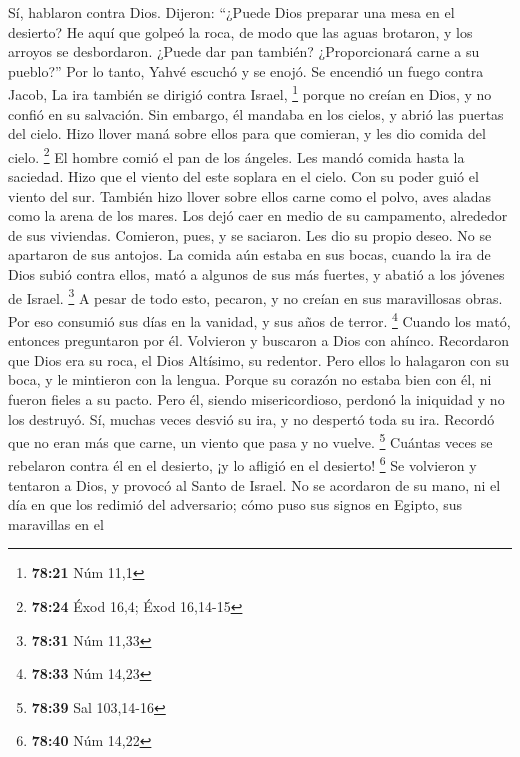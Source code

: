 \begin{paracol}{2}
 Sí, hablaron contra Dios. Dijeron: ``¿Puede Dios
preparar una mesa en el desierto?  He aquí que golpeó la
roca, de modo que las aguas brotaron, y los arroyos se desbordaron.
¿Puede dar pan también? ¿Proporcionará carne a su pueblo?''
 Por lo tanto, Yahvé escuchó y se enojó. Se encendió un
fuego contra Jacob, La ira también se dirigió contra Israel, \footnote{\textbf{78:21}
  Núm 11,1}  porque no creían en Dios, y no confió en su
salvación.  Sin embargo, él mandaba en los cielos, y
abrió las puertas del cielo.  Hizo llover maná sobre
ellos para que comieran, y les dio comida del cielo. \footnote{\textbf{78:24}
  Éxod 16,4; Éxod 16,14-15}  El hombre comió el pan de
los ángeles. Les mandó comida hasta la saciedad.  Hizo
que el viento del este soplara en el cielo. Con su poder guió el viento
del sur.  También hizo llover sobre ellos carne como el
polvo, aves aladas como la arena de los mares.  Los dejó
caer en medio de su campamento, alrededor de sus viviendas.
 Comieron, pues, y se saciaron. Les dio su propio deseo.
 No se apartaron de sus antojos. La comida aún estaba en
sus bocas,  cuando la ira de Dios subió contra ellos,
mató a algunos de sus más fuertes, y abatió a los jóvenes de Israel.
\footnote{\textbf{78:31} Núm 11,33}  A pesar de todo
esto, pecaron, y no creían en sus maravillosas obras. 
Por eso consumió sus días en la vanidad, y sus años de terror.
\footnote{\textbf{78:33} Núm 14,23}  Cuando los mató,
entonces preguntaron por él. Volvieron y buscaron a Dios con ahínco.
 Recordaron que Dios era su roca, el Dios Altísimo, su
redentor.  Pero ellos lo halagaron con su boca, y le
mintieron con la lengua.  Porque su corazón no estaba
bien con él, ni fueron fieles a su pacto.  Pero él,
siendo misericordioso, perdonó la iniquidad y no los destruyó. Sí,
muchas veces desvió su ira, y no despertó toda su ira. 
Recordó que no eran más que carne, un viento que pasa y no vuelve.
\footnote{\textbf{78:39} Sal 103,14-16}  Cuántas veces se
rebelaron contra él en el desierto, ¡y lo afligió en el desierto!
\footnote{\textbf{78:40} Núm 14,22}  Se volvieron y
tentaron a Dios, y provocó al Santo de Israel.  No se
acordaron de su mano, ni el día en que los redimió del adversario;
 cómo puso sus signos en Egipto, sus maravillas en el

\end{paracol}

